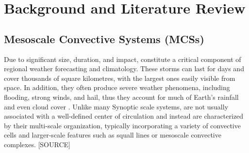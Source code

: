 \chapter{Background and Literature Review}
\label{ch:background}





\section{Mesoscale Convective Systems (MCSs)}

Due to significant size, duration, and impact,  constitute a critical component of regional weather forecasting and climatology.  These storms can last for days and cover thousands of square kilometres, with the largest ones easily visible from space. In addition, they often produce severe weather phenomena, including flooding, strong winds, and hail, thus they account for much of Earth's rainfall and even cloud cover \citep{Houze2014}. Unlike many Synoptic scale systems,  are not usually associated with a well-defined center of circulation and instead are characterized by their multi-scale organization, typically incorporating a variety of convective cells and larger-scale features such as squall lines or mesoscale convective complexes. [SOURCE]

